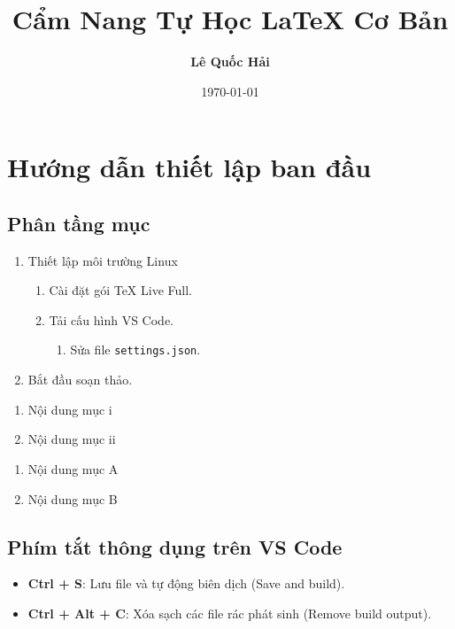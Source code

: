 \documentclass{article}
\title{\textbf{Cẩm Nang Tự Học LaTeX Cơ Bản}}
\author{\textbf{Lê Quốc Hải}}
\date{\today}
\begin{document}
\maketitle

\tableofcontents
\newpage

\section{Hướng dẫn thiết lập ban đầu}

\subsection{Phân tầng mục}

\begin{enumerate}
    \item Thiết lập môi trường Linux
    \begin{enumerate}
        \item Cài đặt gói TeX Live Full.
        \item Tải cấu hình VS Code.
        \begin{enumerate}
            \item Sửa file \texttt{settings.json}.
        \end{enumerate}
    \end{enumerate}
    \item Bắt đầu soạn thảo.
\end{enumerate}

\begin{enumerate}[label=\roman*)]
    \item Nội dung mục i
    \item Nội dung mục ii
\end{enumerate}

\begin{enumerate}[label=\Alph*.]
    \item Nội dung mục A
    \item Nội dung mục B
\end{enumerate}

\subsection{Phím tắt thông dụng trên VS Code}

\begin{itemize}
    \item \textbf{Ctrl + S}: Lưu file và tự động biên dịch (Save and build).
    \item \textbf{Ctrl + Alt + C}: Xóa sạch các file rác phát sinh (Remove build output).
\end{itemize}
\end{document}

